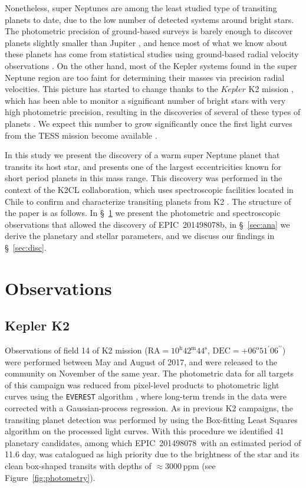 \documentclass[useAMS,usenatbib]{mnras}
\newcommand{\plname}{EPIC~201498078b}
\newcommand{\stname}{EPIC~201498078}
\begin{document}
Nonetheless, super Neptunes are among the least studied type of transiting planets to date, due to the low number of detected systems around bright stars. The photometric precision of
ground-based  surveys is barely enough to discover planets slightly
smaller than Jupiter \citep{hatp11,demangeon,hats43-46}, and hence most of what we know about these planets has come from statistical studies using ground-based radial velocity observations \citep[e.g.][]{jenkins17,udry:2017}.
On the other hand, most of the Kepler systems found in the super Neptune region
are too faint for determining their masses via precision radial velocities.
This picture has started to change thanks to the $Kepler$ K2 mission \citep{howell:2014}, which
has been able to monitor a significant number of bright stars with very
high photometric precision, resulting in the discoveries of several of these types of planets \citep[e.g.][]{vaneylen,k255,k298}. We expect this number to grow significantly once the first light curves from
the TESS mission become available \citep{tess}.

In this study we present the discovery of a warm super Neptune planet
that transits its host star, and presents one of the largest eccentricities
known for short period planets in this mass range.
This discovery was performed in the context of the K2CL collaboration,
which uses spectroscopic facilities located in Chile to confirm
and characterize transiting planets from K2 \citep{brahm:2016:k2,espinoza:2017:k2,jones:2017,giles:2018,soto:2018,k2-232}.
The structure of the paper is as follows. In \S~\ref{sec:obs} we present the
photometric and spectroscopic observations that allowed the discovery of \plname,
in \S~\ref{sec:ana} we derive the planetary and stellar parameters,
and we discuss our findings in \S~\ref{sec:disc}. 

\section[]{Observations}
\label{sec:obs}

\subsection{Kepler K2}
\label{sec:k2}
Observations of field 14 of K2 mission ($\mathrm{RA}=10^\mathrm{h}42^\mathrm{m}44^\mathrm{s}$, $\mathrm{DEC} = +06^\mathrm{o}51^\prime06^{\prime\prime}$) were performed between May and August of 2017, and were released to the community on November of the same year.
The photometric data for all targets of this campaign was reduced from pixel-level products to photometric light curves using the \texttt{EVEREST} algorithm \citep{EVEREST1,EVEREST2}, where long-term trends in the data were corrected with a Gaussian-process regression.
As in previous K2 campaigns, the transiting planet detection was performed by using the Box-fitting Least Squares algorithm \citep{BLS} on the processed light curves.
With this procedure we identified 41 planetary candidates, among which
\stname\ with an estimated period of 11.6 day, was catalogued as high
priority due to the brightness of the star and its clean box-shaped
transits with depths of $\approx 3000$\,ppm (see Figure~\ref{fig:photometry}).
\end{document}
